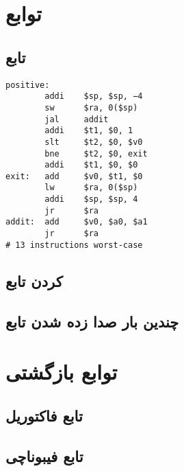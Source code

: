 \documentclass[11pt, dvipsnames, svgnames, x11names]{article}
\begin{document}
\section{توابع}
\subsection{تابع }
\begin{latin}
\begin{lstlisting}[keywords={addi, sw, jal, slt, bne, add, lw, jr}]
positive:
        addi    $sp, $sp, −4
        sw      $ra, 0($sp)
        jal     addit
        addi    $t1, $0, 1
        slt     $t2, $0, $v0
        bne     $t2, $0, exit
        addi    $t1, $0, $0
exit:   add     $v0, $t1, $0
        lw      $ra, 0($sp)
        addi    $sp, $sp, 4
        jr      $ra
addit:  add     $v0, $a0, $a1
        jr      $ra
# 13 instructions worst-case
\end{lstlisting}
\end{latin}
\subsection{ کردن تابع}

\subsection{چندین بار صدا زده شدن تابع}

\section{توابع بازگشتی}

\subsection{تابع فاکتوریل}

\subsection{تابع فیبوناچی}
\end{document}
